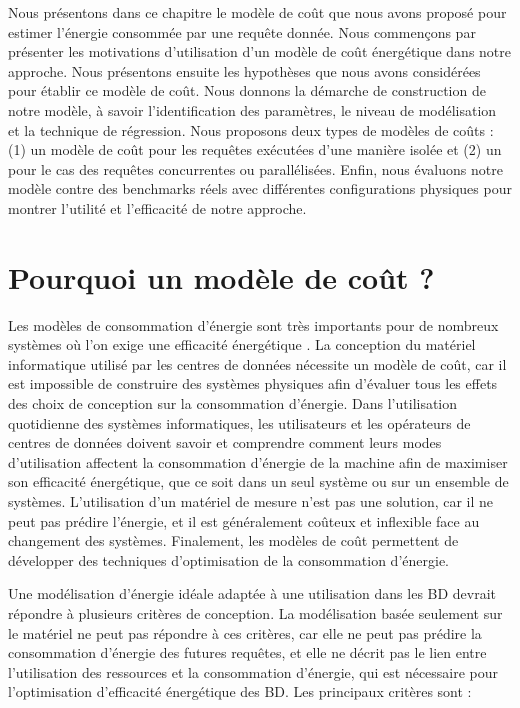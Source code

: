 Nous présentons dans ce chapitre le modèle de coût que nous avons proposé pour estimer l'énergie consommée par une requête donnée. Nous commençons par présenter les motivations d'utilisation d'un modèle de coût énergétique dans notre approche. Nous présentons ensuite les hypothèses que nous avons considérées pour établir ce modèle de coût. Nous donnons la démarche de construction de notre modèle, à savoir l'identification des paramètres, le niveau de modélisation et la technique de régression. Nous proposons deux types de modèles de coûts : (1) un modèle de coût pour les requêtes exécutées d'une manière isolée et (2) un pour le cas des requêtes concurrentes ou parallélisées. Enfin, nous évaluons notre modèle contre des benchmarks réels avec différentes configurations physiques pour montrer l'utilité et l'efficacité de notre approche.

\section{Pourquoi un modèle de coût ?}\label{sec:PourquoiModelCout}

Les modèles de consommation d'énergie sont très importants pour de nombreux systèmes où l'on exige une efficacité énergétique \cite{Rivoire08phd}. La conception du matériel informatique utilisé par les centres de données nécessite un modèle de coût, car il est impossible de construire des systèmes physiques afin d'évaluer tous les effets des choix de conception sur la consommation d'énergie. Dans l'utilisation quotidienne des systèmes informatiques, les utilisateurs et les opérateurs de centres de données doivent savoir et comprendre comment leurs modes d'utilisation affectent la consommation d'énergie de la machine afin de maximiser son efficacité énergétique, que ce soit dans un seul système ou sur un ensemble de systèmes. L'utilisation d'un matériel de mesure n'est pas une solution, car il ne peut pas prédire l'énergie, et il est généralement coûteux et inflexible face au changement des systèmes. Finalement, les modèles de coût permettent de développer des techniques d'optimisation de la consommation d'énergie.

Une modélisation d'énergie idéale adaptée à une utilisation dans les BD devrait répondre à plusieurs critères de conception. La modélisation basée seulement sur le matériel ne peut pas répondre à ces critères, car elle ne peut pas prédire la consommation d'énergie des futures requêtes, et elle ne décrit pas le lien entre l'utilisation des ressources et la consommation d'énergie, qui est nécessaire pour l'optimisation d'efficacité énergétique des BD. Les principaux critères sont :

